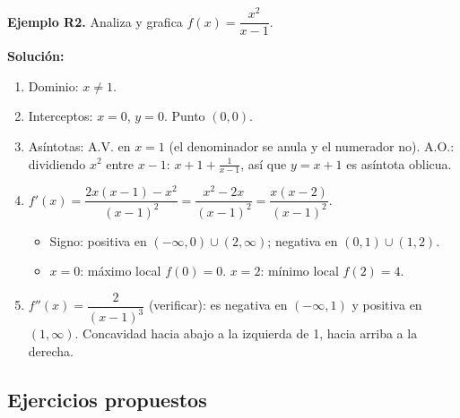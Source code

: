 \documentclass[12pt, a4paper]{article}
\begin{document}
\textbf{Ejemplo R2.} Analiza y grafica $f(x) = \dfrac{x^2}{x - 1}$.

\begin{cuadrosolucion}
  \textbf{Solución:}
  \begin{enumerate}
    \item Dominio: $x \neq 1$.
    \item Interceptos: $x = 0$, $y = 0$. Punto $(0, 0)$.
    \item Asíntotas: A.V. en $x = 1$ (el denominador se anula y el numerador no). A.O.: dividiendo $x^2$ entre $x - 1$: $x + 1 + \frac{1}{x-1}$, así que $y = x + 1$ es asíntota oblicua.
    \item $f'(x) = \dfrac{2x(x - 1) - x^2}{(x - 1)^2} = \dfrac{x^2 - 2x}{(x - 1)^2} = \dfrac{x(x - 2)}{(x - 1)^2}$.
          \begin{itemize}
            \item Signo: positiva en $(-\infty, 0) \cup (2, \infty)$; negativa en $(0, 1) \cup (1, 2)$.
            \item $x = 0$: máximo local $f(0) = 0$. $x = 2$: mínimo local $f(2) = 4$.
          \end{itemize}
    \item $f''(x) = \dfrac{2}{(x - 1)^3}$ (verificar): es negativa en $(-\infty, 1)$ y positiva en $(1, \infty)$. Concavidad hacia abajo a la izquierda de 1, hacia arriba a la derecha.
  \end{enumerate}
\end{cuadrosolucion}

\newpage

\subsection{Ejercicios propuestos}
\end{document}
